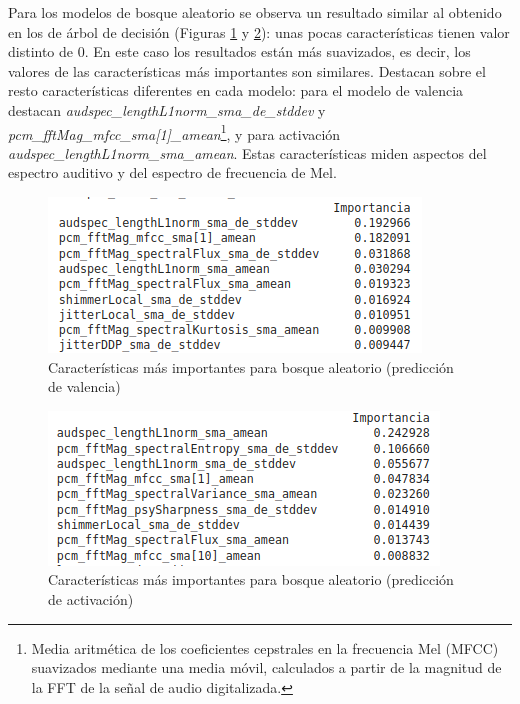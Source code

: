 \documentclass[12pt,a4paper]{article}
\begin{document}
Para los modelos de bosque aleatorio se observa un resultado similar al obtenido en los de árbol de decisión (Figuras \ref{fig:importrandomforestval} y \ref{fig:importrandomforestar}): unas pocas características tienen valor distinto de 0. En este caso los resultados están más suavizados, es decir, los valores de las características más importantes son similares. Destacan sobre el resto características diferentes en cada modelo: para el modelo de valencia destacan \textit{audspec\_lengthL1norm\_sma\_de\_stddev} y \textit{pcm\_fftMag\_mfcc\_sma[1]\_amean}\footnote{Media aritmética de los coeficientes cepstrales en la frecuencia Mel (MFCC) suavizados mediante una media móvil, calculados a partir de la magnitud de la FFT de la señal de audio digitalizada.}, y para activación \textit{audspec\_lengthL1norm\_sma\_amean}. Estas características miden aspectos del espectro auditivo y del espectro de frecuencia de Mel.
\begin{figure}[H]
	\centering
	\includegraphics[width=0.7\linewidth]{figs/import_random_forest_val}
	\caption{Características más importantes para bosque aleatorio (predicción de valencia)}
	\label{fig:importrandomforestval}
\end{figure}
\begin{figure}[H]
	\centering
	\includegraphics[width=0.7\linewidth]{figs/import_random_forest_ar}
	\caption{Características más importantes para bosque aleatorio (predicción de activación)}
	\label{fig:importrandomforestar}
\end{figure}
\end{document}
